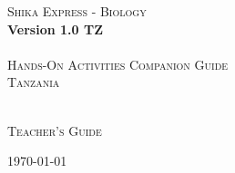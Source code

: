 \begin{titlepage}

\begin{center}
	\textsc{{\Huge Shika Express - Biology}}\\[0.4cm]
	\textbf{{\huge Version 1.0 TZ}}\\[1.5cm]
	\HRule\\[0.4cm]
	\textsc{{\Large Hands-On Activities Companion Guide}}\\[0.4cm]
	\textsc{{\Large Tanzania}}\\[0.4cm]
	\HRule\\[0.5cm]
\end{center}

\vfill
\begin{center}
\textsc{{\Large Teacher's Guide}}\\[0.4cm]
\end{center}

\begin{center}
	{\large \today}
\end{center}

\end{titlepage}
